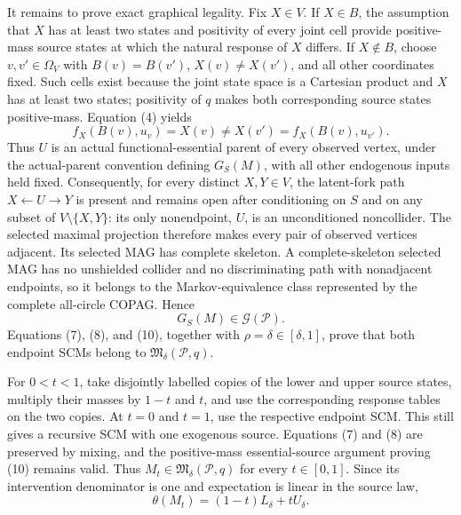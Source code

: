 It remains to prove exact graphical legality.  Fix \(X\in V\).  If \(X\in B\), the assumption that \(X\) has at least two states and positivity of every joint cell provide positive-mass source states at which the natural response of \(X\) differs.  If \(X\notin B\), choose \(v,v'\in\Omega_V\) with \(B(v)=B(v')\), \(X(v)\neq X(v')\), and all other coordinates fixed.  Such cells exist because the joint state space is a Cartesian product and \(X\) has at least two states; positivity of \(q\) makes both corresponding source states positive-mass.  Equation (4) yields
\[
f_X(B(v),u_v)=X(v)\neq X(v')=f_X(B(v),u_{v'}).
\]
Thus \(U\) is an actual functional-essential parent of every observed vertex, under the actual-parent convention defining \(G_S(M)\), with all other endogenous inputs held fixed.  Consequently, for every distinct \(X,Y\in V\), the latent-fork path \(X\leftarrow U\to Y\) is present and remains open after conditioning on \(S\) and on any subset of \(V\setminus\{X,Y\}\): its only nonendpoint, \(U\), is an unconditioned noncollider.  The selected maximal projection therefore makes every pair of observed vertices adjacent.  Its selected MAG has complete skeleton.  A complete-skeleton selected MAG has no unshielded collider and no discriminating path with nonadjacent endpoints, so it belongs to the Markov-equivalence class represented by the complete all-circle COPAG.  Hence
\[
G_S(M)\in\mathcal G(\mathcal P). \tag{10}
\]
Equations (7), (8), and (10), together with \(\rho=\delta\in[\delta,1]\), prove that both endpoint SCMs belong to \(\mathfrak M_\delta(\mathcal P,q)\).

For \(0<t<1\), take disjointly labelled copies of the lower and upper source states, multiply their masses by \(1-t\) and \(t\), and use the corresponding response tables on the two copies.  At \(t=0\) and \(t=1\), use the respective endpoint SCM.  This still gives a recursive SCM with one exogenous source.  Equations (7) and (8) are preserved by mixing, and the positive-mass essential-source argument proving (10) remains valid.  Thus \(M_t\in\mathfrak M_\delta(\mathcal P,q)\) for every \(t\in[0,1]\).  Since its intervention denominator is one and expectation is linear in the source law,
\[
\theta(M_t)=(1-t)L_\delta+tU_\delta. \tag{11}
\]

